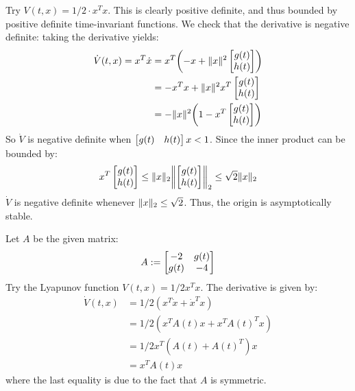 \documentclass{homework}
\begin{document}
\begin{letterenum}
\item Try $V(t, x) = 1/2 \cdot x^T x$. This is clearly positive definite,
and thus bounded by positive definite time-invariant functions.
We check that the derivative is negative definite: taking the derivative
yields:
\begin{align*}
    \dot{V}(t, x) = x^T \dot{x} &= x^T \biggl( -x + \lVert x \rVert^2 \begin{bmatrix} g(t) \\ h(t) \end{bmatrix}\biggr) \\
        &= - x^T x + \lVert x \rVert^2 x^T \begin{bmatrix} g(t) \\ h(t) \end{bmatrix} \\
        &= - \lVert x \rVert^2 \biggl( 1 - x^T \begin{bmatrix} g(t) \\ h(t) \end{bmatrix}\biggr) \\
\end{align*}
So $\dot{V}$ is negative definite when $\begin{bmatrix} g(t) & h(t) \end{bmatrix} x < 1$. Since the
inner product can be bounded by:
\begin{equation*}
    x^T \begin{bmatrix} g(t) \\ h(t) \end{bmatrix} \leq \lVert x \rVert_2
        \biggl\lVert\begin{bmatrix} g(t) \\ h(t) \end{bmatrix}\biggr\rVert_2 \leq \sqrt{2} \lVert x \rVert_2
\end{equation*}
$\dot{V}$ is negative definite whenever $\lVert x \rVert_2 \leq \sqrt{2}$. Thus, the origin
is asymptotically stable.

\item Let $A$ be the given matrix:
\begin{equation*}
    A := \begin{bmatrix} 
        -2 & g(t) \\
        g(t) & -4
     \end{bmatrix}
\end{equation*}
Try the Lyapunov function $V(t, x) = 1/2 x^T x$. The derivative is given by:
\begin{align*}
    \dot{V}(t, x) &= 1/2 (x^T \dot{x} + \dot{x}^T x) \\
        &= 1/2 ( x^T A(t)x + x^T A(t)^T x) \\
        &= 1/2 x^T (A(t) + A(t)^T) x \\
        &= x^T A(t) x
\end{align*}
where the last equality is due to the fact that $A$ is symmetric.


\end{letterenum}
\end{document}
